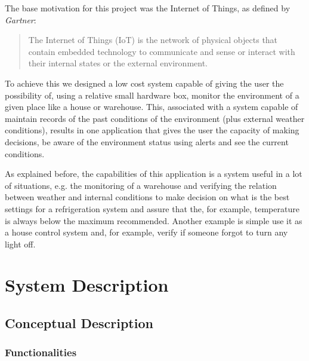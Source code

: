 \documentclass[12pt]{report}
\begin{document}
The base motivation for this project was the Internet of Things, as defined by \textit{Gartner}:

\blockquote{The Internet of Things (IoT) is the network of physical objects that contain embedded technology to communicate and sense or interact with their internal states or the external environment.}

To achieve this we designed a low cost system capable of giving the user the possibility of, using a relative small hardware box, monitor the environment of a given place like a house or warehouse. This, associated with a system capable of maintain records of the past conditions of the environment (plus external weather conditions), results in one application that gives the user the capacity of making decisions, be aware of the environment status using alerts and see the current conditions.

As explained before, the capabilities of this application is a system useful in a lot of situations, e.g. the monitoring of a warehouse and verifying the relation between weather and internal conditions to make decision on what is the best settings for a refrigeration system and assure that the, for example, temperature is always below the maximum recommended. Another example is simple use it as a house control system and, for example, verify if someone forgot to turn any light off.

\newpage
\chapter{System Description}
\section{Conceptual Description}
\subsection{Functionalities}
\end{document}
